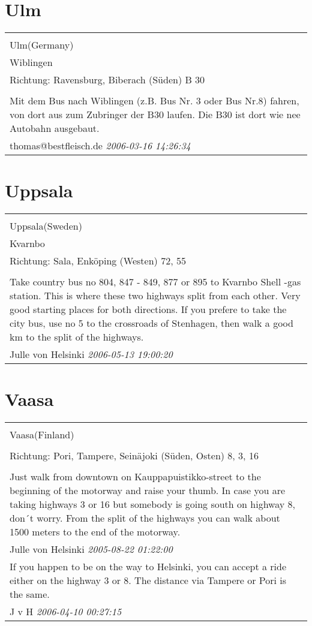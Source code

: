 \documentclass[a4paper,12pt]{article}
\begin{document}
\section{Ulm}
\begin{tabular}{|p{13cm}|}
\hline\\
Ulm(Germany)\\
Wiblingen\\
Richtung: Ravensburg, Biberach (Süden) B 30 \\
\hline\\
Mit dem Bus nach Wiblingen (z.B. Bus Nr. 3 oder Bus Nr.8) fahren,
von dort aus zum Zubringer der B30 laufen. Die B30 ist dort wie nee Autobahn ausgebaut. \\
thomas@bestfleisch.de \textit{ 2006-03-16 14:26:34 }\\\hline
\end{tabular}


\section{Uppsala}
\begin{tabular}{|p{13cm}|}
\hline\\
Uppsala(Sweden)\\
Kvarnbo\\
Richtung: Sala, Enköping (Westen) 72, 55 \\
\hline\\
Take country bus no 804, 847 - 849, 877 or 895 to Kvarnbo Shell -gas station. This is where these two highways split from each other. Very good starting places for both directions. If you prefere to take the city bus, use no 5 to the crossroads of Stenhagen, then walk a good km to the split of the highways. \\
Julle von Helsinki \textit{ 2006-05-13 19:00:20 }\\\hline
\end{tabular}


\section{Vaasa}
\begin{tabular}{|p{13cm}|}
\hline\\
Vaasa(Finland)\\
\\
Richtung: Pori, Tampere, Seinäjoki (Süden, Osten) 8, 3, 16 \\
\hline\\
Just walk from downtown on Kauppapuistikko-street to the beginning of the motorway and raise your thumb. In case you are taking highways 3 or 16 but somebody is going south on highway 8, don´t worry. From the split of the highways you can walk about 1500 meters to the end of the motorway. \\
Julle von Helsinki \textit{ 2005-08-22 01:22:00 }\\\hline If you happen to be on the way to Helsinki, you can accept a ride either on the highway 3 or 8. The distance via Tampere or Pori is the same. \\
J v H \textit{ 2006-04-10 00:27:15 }\\\hline
\end{tabular}
\end{document}
